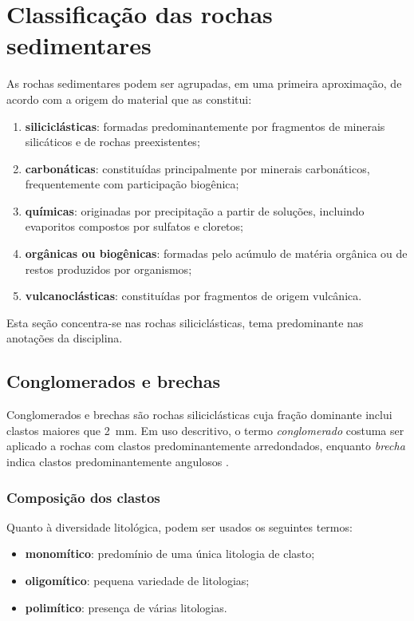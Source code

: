 \section{Classificação das rochas sedimentares}

As rochas sedimentares podem ser agrupadas, em uma primeira aproximação, de acordo com
a origem do material que as constitui:

\begin{enumerate}
  \item \textbf{siliciclásticas}: formadas predominantemente por fragmentos de minerais
        silicáticos e de rochas preexistentes;
  \item \textbf{carbonáticas}: constituídas principalmente por minerais carbonáticos,
        frequentemente com participação biogênica;
  \item \textbf{químicas}: originadas por precipitação a partir de soluções, incluindo
        evaporitos compostos por sulfatos e cloretos;
  \item \textbf{orgânicas ou biogênicas}: formadas pelo acúmulo de matéria orgânica ou de
        restos produzidos por organismos;
  \item \textbf{vulcanoclásticas}: constituídas por fragmentos de origem vulcânica.
\end{enumerate}

Esta seção concentra-se nas rochas siliciclásticas, tema predominante nas anotações da
disciplina.

\subsection{Conglomerados e brechas}

Conglomerados e brechas são rochas siliciclásticas cuja fração dominante inclui clastos
maiores que \SI{2}{\milli\metre}. Em uso descritivo, o termo \emph{conglomerado} costuma
ser aplicado a rochas com clastos predominantemente arredondados, enquanto
\emph{brecha} indica clastos predominantemente angulosos
\parencite{wentworth1922,nichols2009}.

\subsubsection{Composição dos clastos}

Quanto à diversidade litológica, podem ser usados os seguintes termos:

\begin{itemize}
  \item \textbf{monomítico}: predomínio de uma única litologia de clasto;
  \item \textbf{oligomítico}: pequena variedade de litologias;
  \item \textbf{polimítico}: presença de várias litologias.
\end{itemize}

